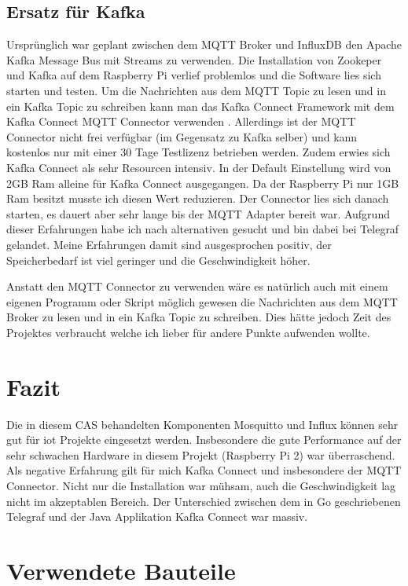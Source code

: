 \documentclass[
  12pt, %
  a4paper, %
  oneside, %
  openany, 
  numbers=noenddot, %
  BCOR=5mm, %
  parskip=half*, %
  thesis, %
]{bfhbook}
\begin{document}
\section{Ersatz für Kafka}
Ursprünglich war geplant zwischen dem MQTT Broker und InfluxDB den Apache Kafka Message Bus mit Streams zu verwenden. Die Installation von Zookeper und Kafka auf dem Raspberry Pi verlief problemlos und die Software lies sich starten und testen. Um die Nachrichten aus dem MQTT Topic zu lesen und in ein Kafka Topic zu schreiben kann man das Kafka Connect Framework mit dem Kafka Connect MQTT Connector verwenden \cite{connect}. Allerdings ist der MQTT Connector nicht frei verfügbar (im Gegensatz zu Kafka selber) und kann kostenlos nur mit einer 30 Tage Testlizenz betrieben werden. Zudem erwies sich Kafka Connect als sehr Resourcen intensiv. In der Default Einstellung wird von 2GB Ram alleine für Kafka Connect ausgegangen. Da der Raspberry Pi nur 1GB Ram besitzt musste ich diesen Wert reduzieren. Der Connector lies sich danach starten, es dauert aber sehr lange bis der MQTT Adapter bereit war. Aufgrund dieser Erfahrungen habe ich nach alternativen gesucht und bin dabei bei Telegraf gelandet. Meine Erfahrungen damit sind ausgesprochen positiv, der Speicherbedarf ist viel geringer und die Geschwindigkeit höher. 

Anstatt den MQTT Connector zu verwenden wäre es natürlich auch mit einem eigenen Programm oder Skript möglich gewesen die Nachrichten aus dem MQTT Broker zu lesen und in ein Kafka Topic zu schreiben. Dies hätte jedoch Zeit des Projektes verbraucht welche ich lieber für andere Punkte aufwenden wollte.
{\let\clearpage\relax \chapter{Fazit}}
Die in diesem CAS behandelten Komponenten Mosquitto und Influx können sehr gut für \Gls{iot} Projekte eingesetzt werden. Insbesondere die gute Performance auf der sehr schwachen Hardware in diesem Projekt (Raspberry Pi 2)  war überraschend. Als negative Erfahrung gilt für mich Kafka Connect und insbesondere der MQTT Connector. Nicht nur die Installation war mühsam, auch die Geschwindigkeit lag nicht im akzeptablen Bereich. Der Unterschied zwischen dem in Go geschriebenen Telegraf und der Java Applikation Kafka Connect war massiv.
{\let\clearpage\relax \chapter{Verwendete Bauteile}}
\end{document}
